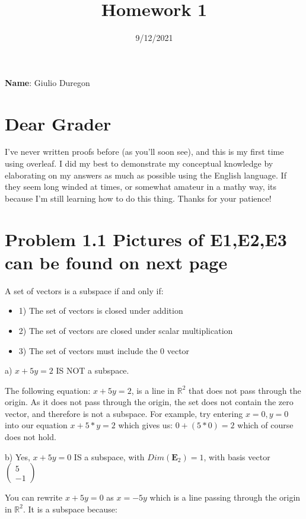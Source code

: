 \documentclass{article}
\title{Homework 1}
\date{9/12/2021}
\begin{document}
\maketitle

\textbf{Name}: Giulio Duregon
\section{Dear Grader}
I've never written proofs before (as you'll soon see), and this is my first time using overleaf. I did my best to demonstrate my conceptual knowledge by elaborating on my answers as much as possible using the English language. If they seem long winded at times, or somewhat amateur in a mathy way, its because I'm still learning how to do this thing. Thanks for your patience!

\break

\section{Problem 1.1 Pictures of E1,E2,E3 can be found on next page}

A set of vectors is a subspace if and only if:
\begin{itemize}
    \item 1) The set of vectors is closed under addition
     \item 2) The set of vectors are closed under scalar multiplication
     \item 3) The set of vectors must include the {0} vector
\end{itemize} 
\par

a)  $x + 5y = 2$ IS NOT a subspace. \par

The following equation: $x + 5y = 2$, is a line in $\mathbb{R}^2$ that does not pass through the origin. As it does not pass through the origin, the set does not contain the zero vector, and therefore is not a subspace. For example, try entering $x=0,y=0$ into our equation $x+5*y=2$ which gives us: $0+(5*0)=2$ which of course does not hold.
\par
b) Yes, $x +5y = 0$ IS a subspace, with $Dim(\mathbf{E}_2)=1$, with basis vector
$\begin{pmatrix}
5\\
-1
\end{pmatrix}$
\par
You can rewrite   $x +5y = 0$ as $x = -5y$ which is a line passing through the origin in $\mathbb{R}^2$. It is a subspace because:
\end{document}
